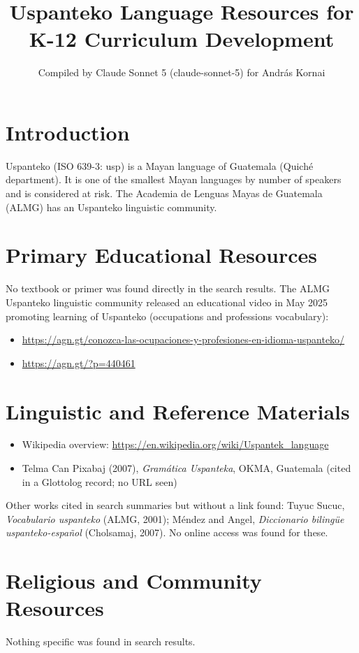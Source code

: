 \documentclass[12pt]{article}
\title{Uspanteko Language Resources for K-12 Curriculum Development}
\author{Compiled by Claude Sonnet 5 (claude-sonnet-5) for Andr\'as Kornai}
\date{}
\begin{document}
\maketitle

\section{Introduction}
Uspanteko (ISO 639-3: usp) is a Mayan language of Guatemala (Quich\'e department). It is one of the smallest Mayan languages by number of speakers and is considered at risk. The Academia de Lenguas Mayas de Guatemala (ALMG) has an Uspanteko linguistic community.

\section{Primary Educational Resources}
No textbook or primer was found directly in the search results. The ALMG Uspanteko linguistic community released an educational video in May 2025 promoting learning of Uspanteko (occupations and professions vocabulary):
\begin{itemize}
\item \url{https://agn.gt/conozca-las-ocupaciones-y-profesiones-en-idioma-uspanteko/}
\item \url{https://agn.gt/?p=440461}
\end{itemize}

\section{Linguistic and Reference Materials}
\begin{itemize}
\item Wikipedia overview: \url{https://en.wikipedia.org/wiki/Uspantek_language}
\item Telma Can Pixabaj (2007), \emph{Gram\'atica Uspanteka}, OKMA, Guatemala (cited in a Glottolog record; no URL seen)
\end{itemize}
Other works cited in search summaries but without a link found: Tuyuc Sucuc, \emph{Vocabulario uspanteko} (ALMG, 2001); M\'endez and Angel, \emph{Diccionario biling\"ue uspanteko-espa\~nol} (Cholsamaj, 2007). No online access was found for these.

\section{Religious and Community Resources}
Nothing specific was found in search results.
\end{document}
